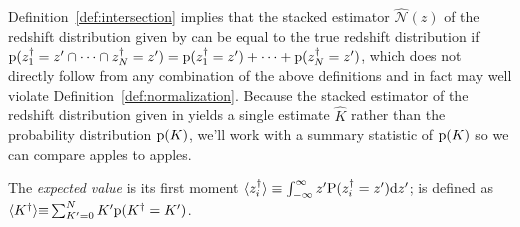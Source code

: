 

Definition~\ref{def:intersection} implies that the stacked estimator $\hat{\mathcal{N}}(z)$ of the redshift distribution given by  can be equal to the true redshift distribution if ${\mathrm{p}(z^{\dagger}_{1} = z' \cap \dots \cap z^{\dagger}_{N} = z')} = {\mathrm{p}(z^{\dagger}_{1} = z') + \dots + \mathrm{p}(z^{\dagger}_{N} = z')}$, which does not directly follow from any combination of the above definitions and in fact may well violate Definition~\ref{def:normalization}.
Because the stacked estimator of the redshift distribution given in  yields a single estimate $\hat{K}$ rather than the probability distribution $\mathrm{p}(K)$, we'll work with a summary statistic of $\mathrm{p}(K)$ so we can compare apples to apples.

\begin{definition}\label{def:expected}
	The \textit{expected value}  is its first moment ${\langle z_{i}^{\dagger} \rangle \equiv {\int_{-\infty}^{\infty}z'\mathrm{P}(z_{i}^{\dagger} = z')\mathrm{d}z'}}$;
	 is defined as ${\langle K^{\dagger} \rangle {\equiv} \sum_{K' = 0}^{N} K' \mathrm{p}(K^{\dagger} = K')}$.
\end{definition}

